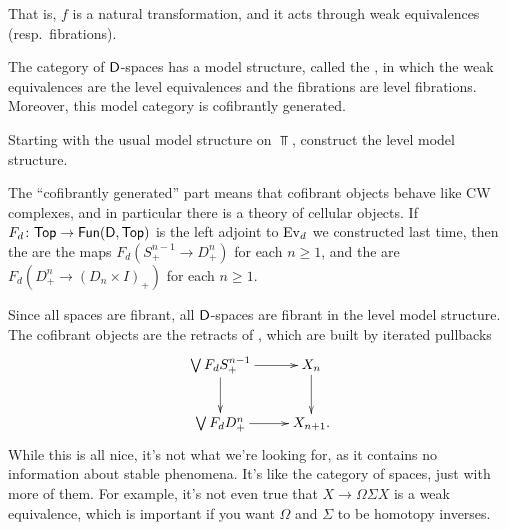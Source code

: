 That is, $f$ is a natural transformation, and it acts through weak equivalences (resp.\ fibrations).
\begin{thm}
The category of $\mathsf D$-spaces has a model structure, called the , in which the weak
equivalences are the level equivalences and the fibrations are level fibrations. Moreover, this model category is
cofibrantly generated.
\end{thm}
\begin{ex}
Starting with the usual model structure on $\Top$, construct the level model structure.
\end{ex}
The ``cofibrantly generated'' part means that cofibrant objects behave like CW complexes, and in particular there
is a theory of cellular objects. If $F_d\colon\mathsf{Top}\to\mathsf{Fun}(\mathsf D,\mathsf{Top})$ is the left adjoint to $\operatorname{Ev}_d$ we constructed
last time, then the  are the maps $F_d(S_+^{n-1}\to D_+^n)$ for each $n\ge 1$, and
the  are $F_d(D_+^n\to (D_n\times I)_+)$ for each $n\ge 1$.

Since all spaces are fibrant, all $\mathsf D$-spaces are fibrant in the level model structure. The cofibrant objects are
the retracts of , which are built by iterated pullbacks
\[\xymatrix{
	\bigvee F_d S_+^{n-1}\ar[r]\ar[d] & X_n\ar[d]\\
	\bigvee F_dD_+^n\ar[r] & X_{n+1}.
}\]
While this is all nice, it's not what we're looking for, as it contains no information about stable phenomena. It's
like the category of spaces, just with more of them. For example, it's not even true that $X\to\Omega\Sigma X$ is a
weak equivalence, which is important if you want $\Omega$ and $\Sigma$ to be homotopy inverses.

